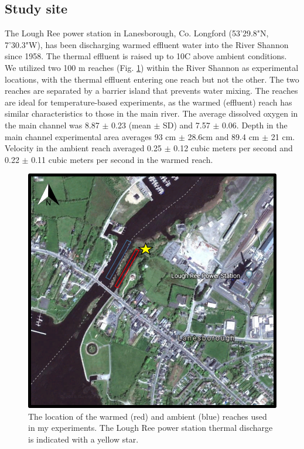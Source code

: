 \subsection{Study site}

The Lough Ree power station in Lanesborough, Co. Longford \linebreak(53'29.8"N, 7'30.3"W), has been discharging warmed effluent water into the River Shannon since 1958. The thermal effluent is raised up to 10\degree C above ambient conditions. We utilized two 100 m reaches (Fig. \ref{fig:shannonmap}) within the River Shannon as experimental locations, with the thermal effluent entering one reach but not the other. The two reaches are separated by a barrier island that prevents water mixing. The reaches are ideal for temperature-based experiments, as the warmed (effluent) reach has similar characteristics to those in the main river. The average dissolved oxygen in the main channel was 8.87 $\pm$ 0.23 (mean $\pm$ SD) and 7.57 $\pm$ 0.06. Depth in the main channel experimental area averages 93 cm $\pm$ 28.6cm and 89.4 cm $\pm$ 21 cm. Velocity in the ambient reach averaged 0.25 $\pm$ 0.12 cubic meters per second and 0.22 $\pm$ 0.11 cubic meters per second  in the warmed reach. 


\begin{figure}%
    \centering
    \includegraphics[scale=0.9]{figures/ch5/shannonmap.png}
  \caption [Map of thermal effluent experimental site in the River Shannon]{The location of the warmed (red) and ambient (blue) reaches used in my experiments. The Lough Ree power station thermal discharge is indicated with a yellow star.} 
    \label{fig:shannonmap}
\end{figure}

